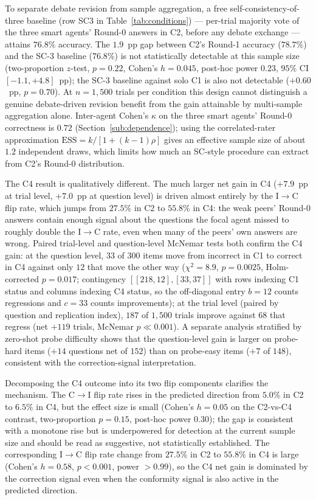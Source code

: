 \documentclass[review,3p,authoryear]{elsarticle}
\begin{document}
To separate debate revision from sample aggregation, a free
self-consistency-of-three baseline (row SC3 in
Table~\ref{tab:conditions}) — per-trial majority vote of the three
smart agents' Round-0 answers in C2, before any debate exchange —
attains $76.8\%$ accuracy.
The $1.9$~pp gap between C2's Round-1 accuracy ($78.7\%$) and the SC-3
baseline ($76.8\%$) is not statistically detectable at this sample size
(two-proportion $z$-test, $p = 0.22$, Cohen's $h = 0.045$, post-hoc
power $0.23$, $95\%$ CI $[-1.1, +4.8]$~pp); the SC-3 baseline against
solo C1 is also not detectable ($+0.60$~pp, $p = 0.70$).
At $n = 1{,}500$ trials per condition this design cannot distinguish a
genuine debate-driven revision benefit from the gain attainable by
multi-sample aggregation alone.
Inter-agent Cohen's $\kappa$ on the three smart agents' Round-0
correctness is $0.72$ (Section~\ref{sub:dependence}); using the
correlated-rater approximation $\mathrm{ESS} = k / [1 + (k-1)\rho]$
gives an effective sample size of about $1.2$ independent draws,
which limits how much an SC-style procedure can extract from C2's
Round-0 distribution.

The C4 result is qualitatively different.
The much larger net gain in C4 ($+7.9$~pp at trial level, $+7.0$~pp
at question level) is driven almost entirely by the I$\rightarrow$C
flip rate, which jumps from $27.5\%$ in C2 to $55.8\%$ in C4: the
weak peers' Round-0 answers contain enough signal about the questions
the focal agent missed to roughly double the I$\rightarrow$C rate,
even when many of the peers' own answers are wrong.
Paired trial-level and question-level McNemar tests both confirm the
C4 gain: at the question level, $33$ of $300$ items move from
incorrect in C1 to correct in C4 against only $12$ that move the
other way ($\chi^2 = 8.9$, $p = 0.0025$, Holm-corrected $p = 0.017$;
contingency $[[218, 12], [33, 37]]$ with rows indexing C1 status and
columns indexing C4 status, so the off-diagonal entry $b = 12$
counts regressions and $c = 33$ counts improvements); at the trial
level (paired by question and replication index), $187$ of $1{,}500$
trials improve against $68$ that regress (net $+119$ trials, McNemar
$p \ll 0.001$).
A separate analysis stratified by zero-shot probe difficulty shows
that the question-level gain is larger on probe-hard items ($+14$
questions net of $152$) than on probe-easy items ($+7$ of $148$),
consistent with the correction-signal interpretation.

Decomposing the C4 outcome into its two flip components clarifies the
mechanism.
The C$\rightarrow$I flip rate rises in the predicted direction from
$5.0\%$ in C2 to $6.5\%$ in C4, but the effect size is small (Cohen's
$h = 0.05$ on the C2-vs-C4 contrast, two-proportion $p = 0.15$,
post-hoc power $0.30$); the gap is consistent with a monotone rise
but is underpowered for detection at the current sample size and
should be read as suggestive, not statistically established.
The corresponding I$\rightarrow$C flip rate change from $27.5\%$ in
C2 to $55.8\%$ in C4 is large (Cohen's $h = 0.58$, $p < 0.001$, power
$> 0.99$), so the C4 net gain is dominated by the correction signal
even when the conformity signal is also active in the predicted
direction.
\end{document}
